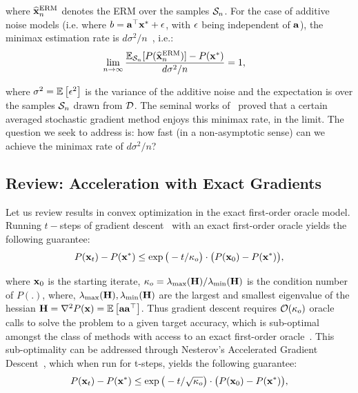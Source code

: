 \vspace{-0.3cm}
\noindent where $\widehat{\mathbf{x}}_n^{\textrm{ERM}}$ denotes the ERM over the samples $\mathcal{S}_n$. For the case of additive noise models (i.e. where $b=\mathbf{a}^{\top}\mathbf{x}^*+\epsilon$, with $\epsilon$ being independent of $\mathbf{a}$), the minimax estimation rate is $d\sigma^2/n$~\citep{KushnerClark,PolyakJ92,lehmann1998theory,Vaart00}, i.e.:
\vspace{-0.2cm}
\begin{align} \label{eq:ERMVarianceAdditive}
\lim_{n\to\infty}\frac{\mathbb{E}_{\mathcal{S}_n}[P(\widehat{\mathbf{x}}_n^{\textrm{ERM}})]-P(\mathbf{x}^*)}{d\sigma^2/n} &= 1,
\end{align}

\vspace{-0.2cm}
\noindent where $\sigma^2=\mathbb{E}\left[\epsilon^2\right]$ is the variance of the additive noise and the expectation is over the samples $\mathcal{S}_n$ drawn from $\mathcal{D}$.  The seminal works of~\cite{Ruppert88,PolyakJ92} proved that a certain averaged stochastic gradient method enjoys this minimax rate, in the limit.  The question we seek to address is: how fast (in a non-asymptotic sense) can we achieve the minimax rate of $d\sigma^2/n$?\vspace*{-1mm}
\subsection{Review: Acceleration with Exact Gradients}\label{sec:background}
Let us review results in convex optimization in the exact first-order oracle model. Running $t-$steps of gradient descent~\citep{Cauchy1847} with an exact first-order oracle yields the
following guarantee:\vspace*{-2mm}
\begin{align*}
P(\mathbf{x}_t)-P(\mathbf{x}^*)\leq \exp\big(-t/{\kappa}_o\big)\cdot\big(P(\mathbf{x}_0)-P(\mathbf{x}^*)\big),
\end{align*}

\vspace{-0.2cm}
\noindent where $\mathbf{x}_0$ is the starting iterate, ${\kappa}_o=\lambda_{\max}(\mathbf{H})/\lambda_{\min}(\mathbf{H})$ is the condition number of $P(.)$, where, $\lambda_{\max}(\mathbf{H}),\lambda_{\min}(\mathbf{H})$ are the largest and smallest eigenvalue of the hessian $\mathbf{H}=\nabla^2P(\mathbf{x})=\mathbb{E}\left[\mathbf{a}\mathbf{a}^{\top}\right]$. Thus gradient descent requires $\mathcal{O}({\kappa}_o)$ oracle calls to solve the problem to a given target accuracy, which is sub-optimal amongst the class of methods with access to an exact first-order oracle~\citep{Nesterov04}. This sub-optimality can be addressed through Nesterov's Accelerated Gradient Descent~\citep{Nesterov83}, which when run for t-steps, yields the following guarantee:
\vspace{-0.2cm}
\begin{align*}
P(\mathbf{x}_t)-P(\mathbf{x}^*)\leq \exp\big(-t/\sqrt{{\kappa}_o}\big)\cdot\big(P(\mathbf{x}_0)-P(\mathbf{x}^*)\big),
\end{align*}

